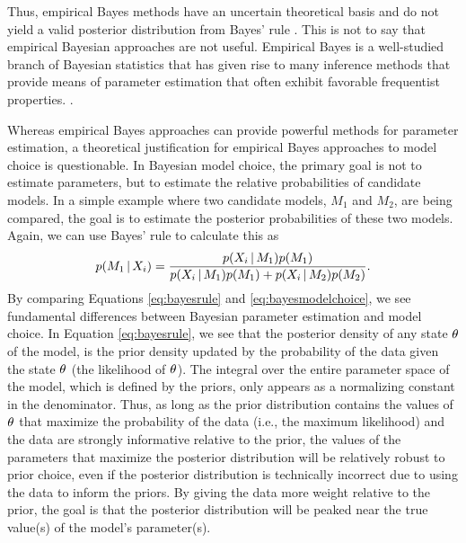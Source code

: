 Thus, empirical Bayes methods have an uncertain theoretical basis and
do not yield a valid posterior distribution from Bayes' rule \citep[e.g.,
empirical Bayesian estimates of the posterior are often too narrow, off-center,
and incorrectly shaped;][]{Morris1983,Laird1987,Carlin1990,Efron2013}.
This is not to say that empirical Bayesian approaches are not useful.
Empirical Bayes is a well-studied branch of Bayesian statistics that has given
rise to many inference methods that provide means of parameter estimation that
often exhibit favorable frequentist properties.
\citep{Morris1983,Laird1987,Laird1989, Carlin1990,Hwang2009}.

\begin{linenomath}
Whereas empirical Bayes approaches can provide powerful methods for parameter
estimation, a theoretical justification for empirical Bayes approaches to model
choice is questionable.
In Bayesian model choice, the primary goal is not to estimate parameters, but
to estimate the relative probabilities of candidate models.
In a simple example where two candidate models, $M_1$ and $M_2$, are being
compared, the goal is to estimate the posterior probabilities of these two
models.
Again, we can use Bayes' rule to calculate this as
\begin{equation}
    p(M_1 \given \alignment{i}{}) = \frac{p(\alignment{i}{} \given
    M_1)p(M_1)}{p(\alignment{i}{} \given M_1)p(M_1) + p(\alignment{i}{} \given
    M_2)p(M_2)}.
    \label{eq:bayesmodelchoice}
\end{equation}
By comparing Equations \ref{eq:bayesrule} and \ref{eq:bayesmodelchoice}, we
see fundamental differences between Bayesian parameter estimation and
model choice.
In Equation \ref{eq:bayesrule}, we see that the posterior density of any
state $\theta_{}$ of the model, is the prior density updated by the
probability of the data given the state $\theta_{}$ (the likelihood of
$\theta_{}$).
The integral over the entire parameter space of the model, which is defined by
the priors, only appears as a normalizing constant in the denominator.
Thus, as long as the prior distribution contains the values of $\theta_{}$
that maximize the probability of the data (i.e., the maximum likelihood) and
the data are strongly informative relative to the prior, the values of the
parameters that maximize the posterior distribution will be relatively robust
to prior choice, even if the posterior distribution is technically incorrect
due to using the data to inform the priors.
By giving the data more weight relative to the prior, the goal is that the
posterior distribution will be peaked near the true value(s) of the model's
parameter(s).
\end{linenomath}

